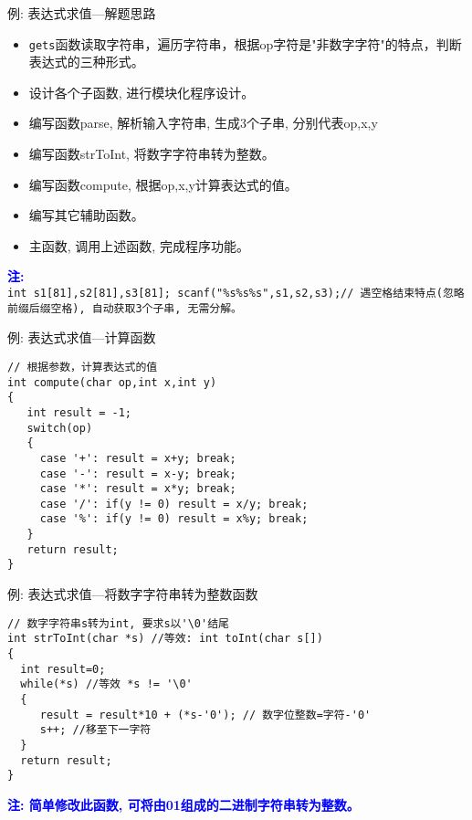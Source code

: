 \begin{frame}{例: 表达式求值---解题思路}
\vspace{-0.5cm}
\begin{itemize}
	\item \lstinline|gets|函数读取字符串，遍历字符串，根据op字符是"非数字字符"的特点，判断表达式的三种形式。\\
	\item 设计各个子函数, 进行模块化程序设计。
	\item 编写函数parse, 解析输入字符串, 生成3个子串, 分别代表op,x,y
	\item 编写函数strToInt, 将数字字符串转为整数。
	\item 编写函数compute, 根据op,x,y计算表达式的值。
	\item 编写其它辅助函数。
	\item 主函数, 调用上述函数, 完成程序功能。
\end{itemize}
\textbf{\textcolor{blue}{注:}}\\
	 \lstinline|int s1[81],s2[81],s3[81]; scanf("%s%s%s",s1,s2,s3);// 遇空格结束特点(忽略前缀后缀空格), 自动获取3个子串, 无需分解。|
\end{frame}

\begin{frame}{例: 表达式求值---计算函数}
\begin{lstlisting}
// 根据参数，计算表达式的值 
int compute(char op,int x,int y)
{
   int result = -1;
   switch(op)
   {
     case '+': result = x+y; break;
     case '-': result = x-y; break;
     case '*': result = x*y; break;
     case '/': if(y != 0) result = x/y; break;
     case '%': if(y != 0) result = x%y; break;
   }
   return result;
}
\end{lstlisting}
\end{frame}

\begin{frame}{例: 表达式求值---将数字字符串转为整数函数}
\begin{lstlisting}
// 数字字符串s转为int, 要求s以'\0'结尾 
int strToInt(char *s) //等效: int toInt(char s[]) 
{
  int result=0;
  while(*s) //等效 *s != '\0'
  {
     result = result*10 + (*s-'0'); // 数字位整数=字符-'0'
     s++; //移至下一字符 
  }
  return result;
} 
\end{lstlisting}
\textbf{\textcolor{blue}{注: 简单修改此函数, 可将由01组成的二进制字符串转为整数。}}
\end{frame}

